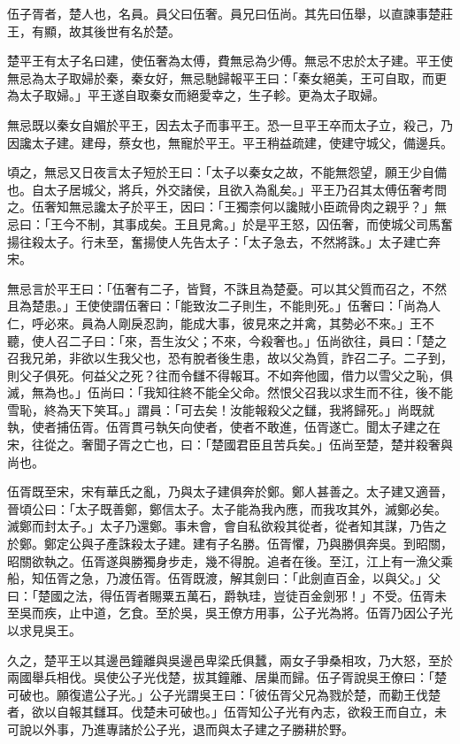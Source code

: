 
\begin{pinyinscope}
伍子胥者，楚人也，名員。員父曰伍奢。員兄曰伍尚。其先曰伍舉，以直諫事楚莊王，有顯，故其後世有名於楚。

楚平王有太子名曰建，使伍奢為太傅，費無忌為少傅。無忌不忠於太子建。平王使無忌為太子取婦於秦，秦女好，無忌馳歸報平王曰：「秦女絕美，王可自取，而更為太子取婦。」平王遂自取秦女而絕愛幸之，生子軫。更為太子取婦。

無忌既以秦女自媚於平王，因去太子而事平王。恐一旦平王卒而太子立，殺己，乃因讒太子建。建母，蔡女也，無寵於平王。平王稍益疏建，使建守城父，備邊兵。

頃之，無忌又日夜言太子短於王曰：「太子以秦女之故，不能無怨望，願王少自備也。自太子居城父，將兵，外交諸侯，且欲入為亂矣。」平王乃召其太傅伍奢考問之。伍奢知無忌讒太子於平王，因曰：「王獨柰何以讒賊小臣疏骨肉之親乎？」無忌曰：「王今不制，其事成矣。王且見禽。」於是平王怒，囚伍奢，而使城父司馬奮揚往殺太子。行未至，奮揚使人先告太子：「太子急去，不然將誅。」太子建亡奔宋。

無忌言於平王曰：「伍奢有二子，皆賢，不誅且為楚憂。可以其父質而召之，不然且為楚患。」王使使謂伍奢曰：「能致汝二子則生，不能則死。」伍奢曰：「尚為人仁，呼必來。員為人剛戾忍訽，能成大事，彼見來之并禽，其勢必不來。」王不聽，使人召二子曰：「來，吾生汝父；不來，今殺奢也。」伍尚欲往，員曰：「楚之召我兄弟，非欲以生我父也，恐有脫者後生患，故以父為質，詐召二子。二子到，則父子俱死。何益父之死？往而令讎不得報耳。不如奔他國，借力以雪父之恥，俱滅，無為也。」伍尚曰：「我知往終不能全父命。然恨父召我以求生而不往，後不能雪恥，終為天下笑耳。」謂員：「可去矣！汝能報殺父之讎，我將歸死。」尚既就執，使者捕伍胥。伍胥貫弓執矢向使者，使者不敢進，伍胥遂亡。聞太子建之在宋，往從之。奢聞子胥之亡也，曰：「楚國君臣且苦兵矣。」伍尚至楚，楚并殺奢與尚也。

伍胥既至宋，宋有華氏之亂，乃與太子建俱奔於鄭。鄭人甚善之。太子建又適晉，晉頃公曰：「太子既善鄭，鄭信太子。太子能為我內應，而我攻其外，滅鄭必矣。滅鄭而封太子。」太子乃還鄭。事未會，會自私欲殺其從者，從者知其謀，乃告之於鄭。鄭定公與子產誅殺太子建。建有子名勝。伍胥懼，乃與勝俱奔吳。到昭關，昭關欲執之。伍胥遂與勝獨身步走，幾不得脫。追者在後。至江，江上有一漁父乘船，知伍胥之急，乃渡伍胥。伍胥既渡，解其劍曰：「此劍直百金，以與父。」父曰：「楚國之法，得伍胥者賜粟五萬石，爵執珪，豈徒百金劍邪！」不受。伍胥未至吳而疾，止中道，乞食。至於吳，吳王僚方用事，公子光為將。伍胥乃因公子光以求見吳王。

久之，楚平王以其邊邑鐘離與吳邊邑卑梁氏俱蠶，兩女子爭桑相攻，乃大怒，至於兩國舉兵相伐。吳使公子光伐楚，拔其鐘離、居巢而歸。伍子胥說吳王僚曰：「楚可破也。願復遣公子光。」公子光謂吳王曰：「彼伍胥父兄為戮於楚，而勸王伐楚者，欲以自報其讎耳。伐楚未可破也。」伍胥知公子光有內志，欲殺王而自立，未可說以外事，乃進專諸於公子光，退而與太子建之子勝耕於野。


\end{pinyinscope}
